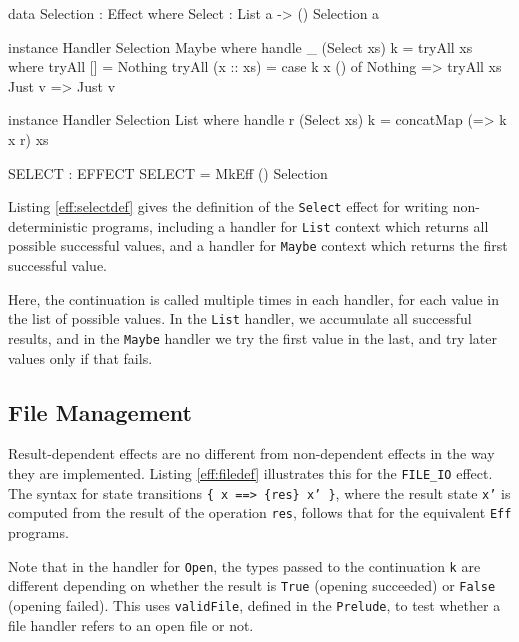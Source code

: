 \begin{code}[float=h,frame=single, caption={Non-determinism Effect Definition}, label=eff:selectdef]
data Selection : Effect where
     Select : List a -> { () } Selection a 

instance Handler Selection Maybe where
     handle _ (Select xs) k = tryAll xs where
         tryAll [] = Nothing
         tryAll (x :: xs) = case k x () of
                                 Nothing => tryAll xs
                                 Just v => Just v

instance Handler Selection List where
     handle r (Select xs) k = concatMap (\x => k x r) xs

SELECT : EFFECT
SELECT = MkEff () Selection
\end{code}

Listing \ref{eff:selectdef} gives the definition of the \texttt{Select} effect
for writing non-deterministic programs, including a handler for \texttt{List}
context which returns all possible successful values, and a handler for
\texttt{Maybe} context which returns the first successful value.

Here, the continuation is called multiple times in each handler, for each
value in the list of possible values. In the \texttt{List} handler, we
accumulate all successful results, and in the \texttt{Maybe} handler we
try the first value in the last, and try later values only if that fails.

\subsection{File Management}

Result-dependent effects are no different from non-dependent effects in
the way they are implemented. Listing \ref{eff:filedef} illustrates this
for the \texttt{FILE\_IO} effect. The syntax for state transitions 
\texttt{\{ x ==> \{res\} x' \}}, where the result state \texttt{x'} is
computed from the result of the operation \texttt{res}, 
follows that for the equivalent
\texttt{Eff} programs.

Note that in the handler for \texttt{Open}, the types passed to the
continuation \texttt{k} are different depending on whether the result
is \texttt{True} (opening succeeded) or \texttt{False} (opening failed).
This uses \texttt{validFile}, defined in the \texttt{Prelude}, to test
whether a file handler refers to an open file or not.

